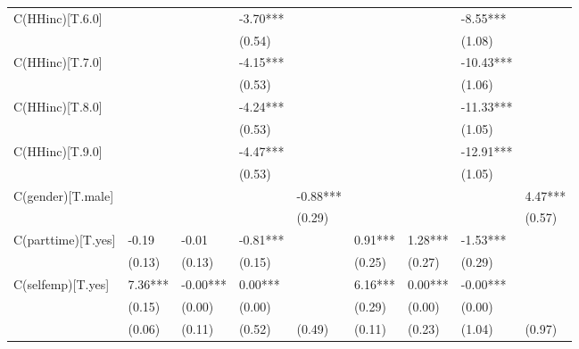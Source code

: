 \documentclass[12pt,notitlepage,onecolumn,aps,pra]{revtex4-1}
\begin{document}
\begin{table}[ht]
\begin{adjustbox}{width={15cm},totalheight={20cm}}
\begin{threeparttable}
\begin{tabular}{lllllllll}
C(HHinc)[T.6.0]    &           &            &    -3.70*** &              &            &             &     -8.55*** &               \\
                   &           &            &      (0.54) &              &            &             &       (1.08) &               \\
C(HHinc)[T.7.0]    &           &            &    -4.15*** &              &            &             &    -10.43*** &               \\
                   &           &            &      (0.53) &              &            &             &       (1.06) &               \\
C(HHinc)[T.8.0]    &           &            &    -4.24*** &              &            &             &    -11.33*** &               \\
                   &           &            &      (0.53) &              &            &             &       (1.05) &               \\
C(HHinc)[T.9.0]    &           &            &    -4.47*** &              &            &             &    -12.91*** &               \\
                   &           &            &      (0.53) &              &            &             &       (1.05) &               \\
C(gender)[T.male]  &           &            &             &     -0.88*** &            &             &              &       4.47*** \\
                   &           &            &             &       (0.29) &            &             &              &        (0.57) \\
C(parttime)[T.yes] &     -0.19 &      -0.01 &    -0.81*** &              &    0.91*** &     1.28*** &     -1.53*** &               \\
                   &    (0.13) &     (0.13) &      (0.15) &              &     (0.25) &      (0.27) &       (0.29) &               \\
C(selfemp)[T.yes]  &   7.36*** &   -0.00*** &     0.00*** &              &    6.16*** &     0.00*** &     -0.00*** &               \\
                   &    (0.15) &     (0.00) &      (0.00) &              &     (0.29) &      (0.00) &       (0.00) &               \\
                   &    (0.06) &     (0.11) &      (0.52) &       (0.49) &     (0.11) &      (0.23) &       (1.04) &        (0.97) \\

\end{tabular}
\end{threeparttable}
\end{adjustbox}
\end{table}
\end{document}
